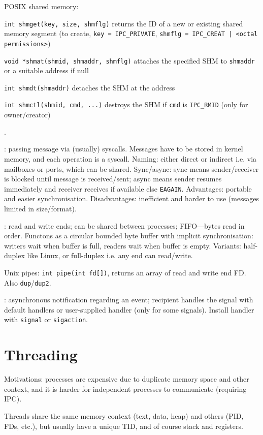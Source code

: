 \documentclass[fontsize=9pt]{slnotes}
\begin{document}
POSIX shared memory: \begin{slinenum}
\item \texttt{int shmget(key, size, shmflg)} returns the ID of a new or existing shared memory segment (to create, \texttt{key = IPC\_PRIVATE}, \texttt{shmflg = IPC\_CREAT | <octal permissions>})
\item \texttt{void *shmat(shmid, shmaddr, shmflg)} attaches the specified SHM to \texttt{shmaddr} or a suitable address if null
\item \texttt{int shmdt(shmaddr)} detaches the SHM at the address
\item \texttt{int shmctl(shmid, cmd, ...)} destroys the SHM if \texttt{cmd} is \texttt{IPC\_RMID} (only for owner/creator)
\end{slinenum}.

: passing message via (usually) syscalls. Messages have to be stored in kernel memory, and each operation is a syscall. Naming: either direct or indirect i.e. via mailboxes or ports, which can be shared. Sync/async: sync means sender/receiver is blocked until message is received/sent; async means sender resumes immediately and receiver receives if available else \texttt{EAGAIN}. Advantages: portable and easier synchronisation. Disadvantages: inefficient and harder to use (messages limited in size/format).

: read and write ends; can be shared between processes; FIFO---bytes read in order. Functons as a circular bounded byte buffer with implicit synchronisation: writers wait when buffer is full, readers wait when buffer is empty. Variants: half-duplex like Linux, or full-duplex i.e. any end can read/write.

Unix pipes: \texttt{int pipe(int fd[])}, returns an array of read and write end FD. Also \texttt{dup}/\texttt{dup2}.

: asynchronous notification regarding an event; recipient handles the signal with default handlers or user-supplied handler (only for some signals). Install handler with \texttt{signal} or \texttt{sigaction}.

\chapter{Threading}
Motivations: processes are expensive due to duplicate memory space and other context, and it is harder for independent processes to communicate (requiring IPC).

Threads share the same memory context (text, data, heap) and others (PID, FDs, etc.), but usually have a unique TID, and of course stack and registers.
\end{document}
